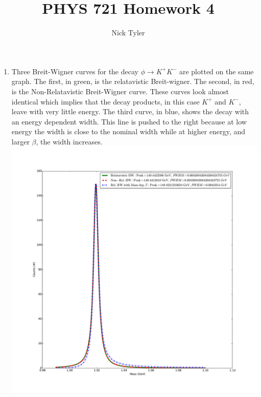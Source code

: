\documentclass[pdftex]{article}
\title{PHYS 721 Homework 4}
\author{Nick Tyler}
\date{}
\begin{document}
\maketitle
\begin{enumerate}
	\item Three Breit-Wigner curves for the decay $\phi \rightarrow K^{+} K^{- }$ are plotted on the same graph. 
		The first, in green, is the relatavistic Breit-wigner. The second, in red, is the Non-Relatavistic
		Breit-Wigner curve.  These curves look almost identical which implies that the decay products, 
		in this case $K^{+}$ and $K^{-}$, leave with very little energy. The third curve, in blue,
		shows the decay with an energy dependent width.  This line is pushed to the right because at
		low energy the width is close to the nominal width while at higher energy, and larger $\beta$,
		the width increases.\\
		\includegraphics[scale=0.35]{Problem_1.pdf}\\

\end{enumerate}
\end{document}
